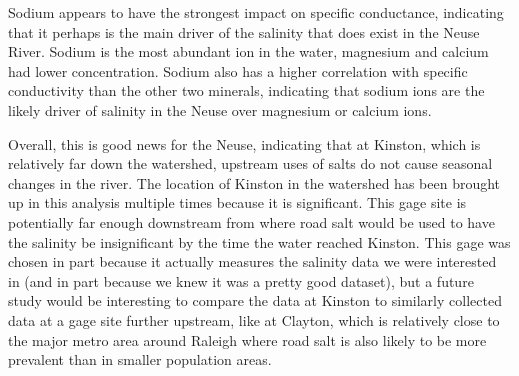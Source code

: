 \documentclass[
  12pt,
]{article}
\begin{document}
Sodium appears to have the strongest impact on specific conductance,
indicating that it perhaps is the main driver of the salinity that does
exist in the Neuse River. Sodium is the most abundant ion in the water,
magnesium and calcium had lower concentration. Sodium also has a higher
correlation with specific conductivity than the other two minerals,
indicating that sodium ions are the likely driver of salinity in the
Neuse over magnesium or calcium ions.

Overall, this is good news for the Neuse, indicating that at Kinston,
which is relatively far down the watershed, upstream uses of salts do
not cause seasonal changes in the river. The location of Kinston in the
watershed has been brought up in this analysis multiple times because it
is significant. This gage site is potentially far enough downstream from
where road salt would be used to have the salinity be insignificant by
the time the water reached Kinston. This gage was chosen in part because
it actually measures the salinity data we were interested in (and in
part because we knew it was a pretty good dataset), but a future study
would be interesting to compare the data at Kinston to similarly
collected data at a gage site further upstream, like at Clayton, which
is relatively close to the major metro area around Raleigh where road
salt is also likely to be more prevalent than in smaller population
areas.
\end{document}
